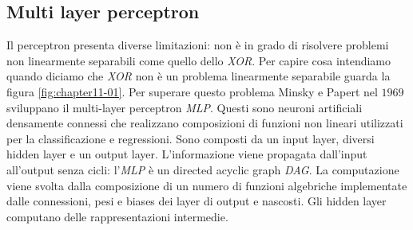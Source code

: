 	\subsection{Multi layer perceptron}
	Il perceptron presenta diverse limitazioni: non \`e in grado di risolvere problemi non linearmente separabili come quello dello \emph{XOR}. 
	Per capire cosa intendiamo quando diciamo che \emph{XOR} non \`e un problema linearmente separabile guarda la figura \ref{fig:chapter11-01}.
	Per superare questo problema Minsky e Papert nel $1969$ sviluppano il multi-layer perceptron \emph{MLP}.
	Questi sono neuroni artificiali densamente connessi che realizzano composizioni di funzioni non lineari utilizzati per la classificazione e regressioni.
	Sono composti da un input layer, diversi hidden layer e un output layer.
	L'informazione viene propagata dall'input all'output senza cicli: l'\emph{MLP} \`e un directed acyclic graph \emph{DAG}.
	La computazione viene svolta dalla composizione di un numero di funzioni algebriche implementate dalle connessioni, pesi e biases dei layer di output e nascosti.
	Gli hidden layer computano delle rappresentazioni intermedie.

